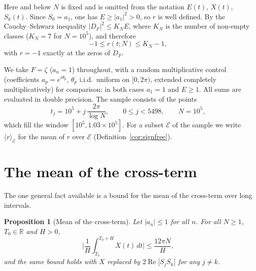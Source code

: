 \documentclass[11pt]{amsart}
\newtheorem{proposition}[theorem]{Proposition}
\theoremstyle{definition}
\theoremstyle{remark}
\newcommand{\re}{\operatorname{Re}}
\begin{document}
Here and below $N$ is fixed and is omitted from the notation $E(t)$,
$X(t)$, $S_k(t)$. Since $S_0=a_1$, one has $E\ge|a_1|^2>0$, so $r$ is
well defined. By the Cauchy--Schwarz inequality
$|D_F|^2\le K_N E$, where $K_N$ is the number of non-empty classes
($K_N=7$ for $N=10^5$), and therefore
\[
-1\le r(t;N)\le K_N-1 ,
\]
with $r=-1$ exactly at the zeros of $D_F$.

We take $F=\zeta$ ($a_n=1$) throughout, with a random multiplicative
control (coefficients $a_p=e^{i\theta_p}$, $\theta_p$ i.i.d.\ uniform on
$[0,2\pi)$, extended completely multiplicatively) for comparison; in both
cases $a_1=1$ and $E\ge1$. All sums are evaluated in double precision.
The sample consists of the points
\begin{equation*}
t_j=10^5+j\,\frac{2\pi}{\log N},\qquad 0\le j<5498,\qquad N=10^5,
\end{equation*}
which fill the window $[10^5,1.03\times10^5]$. For a subset $\mathcal E$
of the sample we write $\langle r\rangle_{\mathcal E}$ for the mean of
$r$ over $\mathcal E$ (Definition~\ref{cor:signfree}).

\section{The mean of the cross-term}
\label{sec:conditional}

The one general fact available is a bound for the mean of the cross-term
over long intervals.

\begin{proposition}[Mean of the cross-term]\label{prop:mvt}
Let $|a_n|\le1$ for all $n$. For all $N\ge1$, $T_0\in\mathbb{R}$ and
$H>0$,
\begin{equation}\label{eq:mvt}
\bigg|\frac{1}{H}\int_{T_0}^{T_0+H} X(t)\,dt\bigg|
\le\frac{12\pi N}{H},
\end{equation}
and the same bound holds with $X$ replaced by
$2\re\big[S_j\overline{S_k}\big]$ for any $j\ne k$.
\end{proposition}
\end{document}
